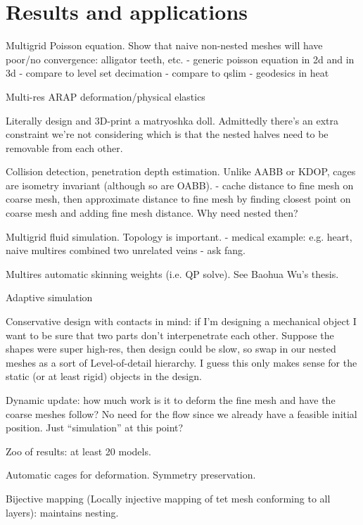 
\section{Results and applications}
\label{sec:results}

Multigrid Poisson equation. Show that naive non-nested meshes will have
poor/no convergence: alligator teeth, etc.
  - generic poisson equation in 2d and in 3d
    - compare to level set decimation
    - compare to qslim
  - geodesics in heat 

Multi-res ARAP deformation/physical elastics

Literally design and 3D-print a matryoshka doll. Admittedly there's an extra
constraint we're not considering which is that the nested halves need to be
removable from each other.

Collision detection, penetration depth estimation. Unlike AABB or KDOP, cages
are isometry invariant (although so are OABB).
  - cache distance to fine mesh on coarse mesh, then approximate distance to
    fine mesh by finding closest point on coarse mesh and adding fine mesh
    distance. Why need nested then?

Multigrid fluid simulation. Topology is important.
  - medical example: e.g. heart, naive multires combined two unrelated veins
  - ask fang.

Multires automatic skinning weights (i.e. QP solve). See Baohua Wu's thesis.

Adaptive simulation \cite{Debunne:2001:DRD}

Conservative design with contacts in mind: if I'm designing a mechanical object
I want to be sure that two parts don't interpenetrate each other. Suppose the
shapes were super high-res, then design could be slow, so swap in our nested
meshes as a sort of Level-of-detail hierarchy. I guess this only makes sense
for the static (or at least rigid) objects in the design.

Dynamic update: how much work is it to deform the fine mesh and have the coarse
meshes follow? No need for the flow since we already have a feasible initial
position. Just ``simulation'' at this point?

Zoo of results: at least 20 models.

Automatic cages for deformation. Symmetry preservation.

Bijective mapping (Locally injective mapping of tet mesh conforming to all
layers): maintains nesting.

